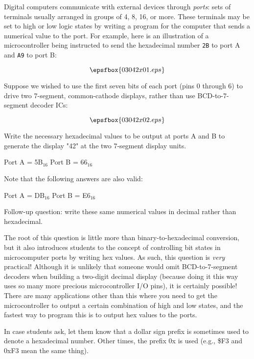 

Digital computers communicate with external devices through {\it ports}: sets of terminals usually arranged in groups of 4, 8, 16, or more.  These terminals may be set to high or low logic states by writing a program for the computer that sends a numerical value to the port.  For example, here is an illustration of a microcontroller being instructed to send the hexadecimal number {\tt 2B} to port A and {\tt A9} to port B:

$$\epsfbox{03042x01.eps}$$

Suppose we wished to use the first seven bits of each port (pins 0 through 6) to drive two 7-segment, common-cathode displays, rather than use BCD-to-7-segment decoder ICs:

$$\epsfbox{03042x02.eps}$$

Write the necessary hexadecimal values to be output at ports A and B to generate the display "42" at the two 7-segment display units.







Port A = 5B$_{16}$ \hskip 50pt Port B = 66$_{16}$

\vskip 10pt

\noindent
Note that the following answers are also valid:

Port A = DB$_{16}$ \hskip 50pt Port B = E6$_{16}$

\vskip 10pt

Follow-up question: write these same numerical values in decimal rather than hexadecimal.







The root of this question is little more than binary-to-hexadecimal conversion, but it also introduces students to the concept of controlling bit states in microcomputer ports by writing hex values.  As such, this question is {\it very} practical!  Although it is unlikely that someone would omit BCD-to-7-segment decoders when building a two-digit decimal display (because doing it this way uses so many more precious microcontroller I/O pins), it is certainly possible!  There are many applications other than this where you need to get the microcontroller to output a certain combination of high and low states, and the fastest way to program this is to output hex values to the ports.

In case students ask, let them know that a dollar sign prefix is sometimes used to denote a hexadecimal number.  Other times, the prefix 0x is used (e.g., \$F3 and 0xF3 mean the same thing).





